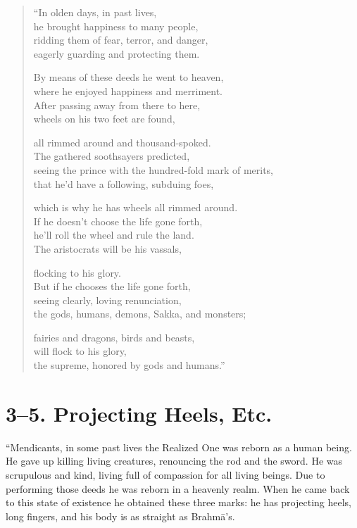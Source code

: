 \documentclass[12pt,openany]{book}%
\begin{document}
\begin{verse}%
“In olden days, in past lives, \\
he brought happiness to many people, \\
ridding them of fear, terror, and danger, \\
eagerly guarding and protecting them. 

By means of these deeds he went to heaven, \\
where he enjoyed happiness and merriment. \\
After passing away from there to here, \\
wheels on his two feet are found, 

all rimmed around and thousand-spoked. \\
The gathered soothsayers predicted, \\
seeing the prince with the hundred-fold mark of merits, \\
that he’d have a following, subduing foes, 

which is why he has wheels all rimmed around. \\
If he doesn’t choose the life gone forth, \\
he’ll roll the wheel and rule the land. \\
The aristocrats will be his vassals, 

flocking to his glory. \\
But if he chooses the life gone forth, \\
seeing clearly, loving renunciation, \\
the gods, humans, demons, Sakka, and monsters; 

fairies and dragons, birds and beasts, \\
will flock to his glory, \\
the supreme, honored by gods and humans.” 

%
\end{verse}

\section*{3–5. Projecting Heels, Etc. }

“Mendicants, in some past lives the Realized One was reborn as a human being. He gave up killing living creatures, renouncing the rod and the sword. He was scrupulous and kind, living full of compassion for all living beings. Due to performing those deeds he was reborn in a heavenly realm. When he came back to this state of existence he obtained these three marks: he has projecting heels, long fingers, and his body is as straight as \textsanskrit{Brahmā}’s. 
\end{document}
